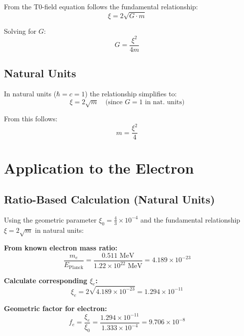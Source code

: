 \documentclass[12pt,a4paper]{article}
\begin{document}
	From the T0-field equation follows the fundamental relationship:
	\begin{equation}
		\xi = 2\sqrt{G \cdot m}
	\end{equation}
	
	Solving for $G$:
	\begin{equation}
		\boxed{G = \frac{\xi^2}{4m}}
	\end{equation}
	
	\subsection{Natural Units}
	
	In natural units ($\hbar = c = 1$) the relationship simplifies to:
	\begin{equation}
		\xi = 2\sqrt{m} \quad \text{(since } G = 1 \text{ in nat. units)}
	\end{equation}
	
	From this follows:
	\begin{equation}
		m = \frac{\xi^2}{4}
	\end{equation}
	
	\section{Application to the Electron}
	
	\subsection{Ratio-Based Calculation (Natural Units)}
	
	Using the geometric parameter $\xi_0 = \frac{4}{3} \times 10^{-4}$ and the fundamental relationship $\xi = 2\sqrt{m}$ in natural units:
	
	\textbf{From known electron mass ratio:}
	\begin{equation}
		\frac{m_e}{E_{\text{Planck}}} = \frac{0.511 \text{ MeV}}{1.22 \times 10^{22} \text{ MeV}} = 4.189 \times 10^{-23}
	\end{equation}
	
	\textbf{Calculate corresponding $\xi_e$:}
	\begin{equation}
		\xi_e = 2\sqrt{4.189 \times 10^{-23}} = 1.294 \times 10^{-11}
	\end{equation}
	
	\textbf{Geometric factor for electron:}
	\begin{equation}
		f_e = \frac{\xi_e}{\xi_0} = \frac{1.294 \times 10^{-11}}{1.333 \times 10^{-4}} = 9.706 \times 10^{-8}
	\end{equation}
	
\end{document}
